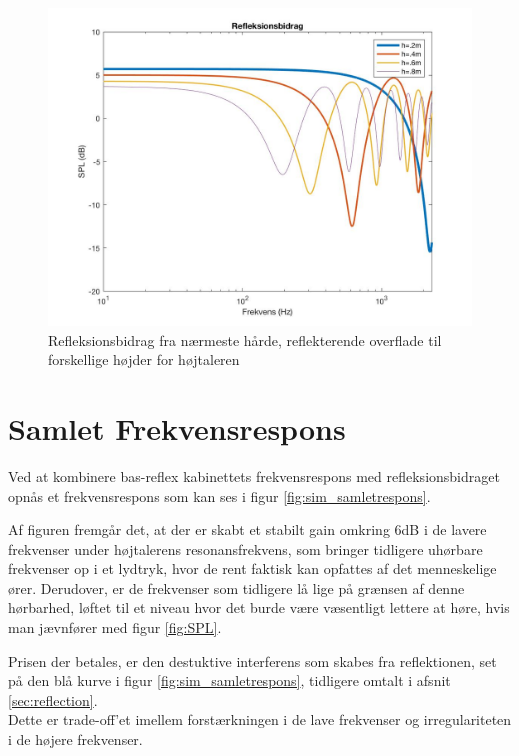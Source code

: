 \begin{figure}[h!]
	\centering
	\includegraphics[width=\textwidth]{Pics/refleksionsbidrag}
	\caption{Refleksionsbidrag fra nærmeste hårde, reflekterende overflade til forskellige højder for højtaleren } 
	\label{fig:refleksionsbidrag}
\end{figure}




\section{Samlet Frekvensrespons}

Ved at kombinere bas-reflex kabinettets frekvensrespons med refleksionsbidraget opnås et frekvensrespons som kan ses i figur \ref{fig:sim_samletrespons}.

Af figuren fremgår det, at der er skabt et stabilt gain omkring 6dB i de lavere frekvenser under højtalerens resonansfrekvens, som bringer tidligere uhørbare frekvenser op i et lydtryk, hvor de rent faktisk kan opfattes af det menneskelige ører. Derudover, er de frekvenser som tidligere lå lige på grænsen af denne hørbarhed, løftet til et niveau hvor det burde være væsentligt lettere at høre, hvis man jævnfører med figur \ref{fig:SPL}.

Prisen der betales, er den destuktive interferens som skabes fra reflektionen, set på den blå kurve i figur \ref{fig:sim_samletrespons}, tidligere omtalt i afsnit \ref{sec:reflection}.\\
Dette er trade-off'et imellem forstærkningen i de lave frekvenser og irregulariteten i de højere frekvenser. 

